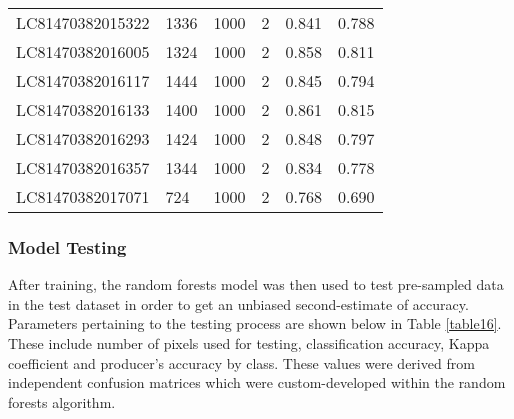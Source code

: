\begin{ThreePartTable}
\begin{longtable}{L{3.2cm} L{1.8cm} L{2cm} L{2.2cm} L{2.5cm} L{1.7cm}}
		LC81470382015322 & 1336 &1000&2&0.841 & 0.788\\[0.05cm]
		LC81470382016005 & 1324 &1000&2& 0.858& 0.811\\ [0.05cm]
		LC81470382016117 & 1444 &1000&2& 0.845& 0.794\\[0.05cm]
		LC81470382016133 & 1400 &1000&2&0.861 & 0.815\\[0.05cm]
		LC81470382016293 & 1424 &1000&2&0.848 & 0.797\\[0.05cm]
		LC81470382016357 & 1344 &1000&2&0.834 & 0.778\\[0.05cm]
		LC81470382017071 & 724 &1000&2& 0.768&  0.690\\[0.05cm]
		\bottomrule[0.25mm]
	\end{longtable}
\end{ThreePartTable}

\subsubsection{Model Testing}

\justify
After training, the random forests model was then used to test pre-sampled data in the test dataset in order to get an unbiased second-estimate of accuracy. Parameters pertaining to the testing process are shown below in Table \ref{table16}. These include number of pixels used for testing, classification accuracy, Kappa coefficient and producer's accuracy by class. These values were derived from independent confusion matrices which were custom-developed within the random forests algorithm.

